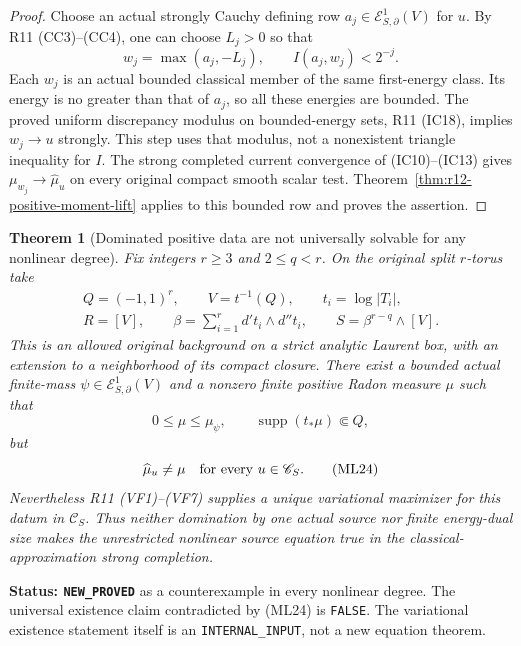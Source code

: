 \documentclass[11pt,a4paper]{article}
\numberwithin{equation}{section}
\newtheorem{theorem}{Theorem}[section]
\theoremstyle{definition}
\theoremstyle{remark}
\begin{document}
\begin{proof}
Choose an actual strongly Cauchy defining row
$a_j\in\mathcal E^1_{S,\partial}(V)$ for $u$.
By R11 \textup{(CC3)--(CC4)}, one can choose $L_j>0$ so that
\[
 w_j=\max(a_j,-L_j),\qquad I(a_j,w_j)<2^{-j}.
 \tag{ML21}
\]
Each $w_j$ is an actual bounded classical member of the same
first-energy class.  Its energy is no greater than that of
$a_j$, so all these energies are bounded.  The proved uniform
discrepancy modulus on bounded-energy sets, R11
\textup{(IC18)}, implies $w_j\to u$ strongly.  This step
uses that modulus, not a nonexistent triangle inequality for
$I$.  The strong completed current convergence of
\textup{(IC10)--(IC13)} gives
$\mu_{w_j}\to\widehat\mu_u$ on every original compact smooth
scalar test.  Theorem~\ref{thm:r12-positive-moment-lift}
applies to this bounded row and proves the assertion.
\end{proof}

\begin{theorem}[Dominated positive data are not universally solvable for any nonlinear degree]
\label{thm:r12-nonlinear-dominated-source-counterexample}
Fix integers $r\ge3$ and $2\le q<r$.  On the original split
$r$-torus take
\[
 \begin{gathered}
 Q=(-1,1)^r,\qquad V=t^{-1}(Q),\qquad t_i=\log|T_i|,\\
 R=[V],\qquad \beta=\sum_{i=1}^r d't_i\wedge d''t_i,
 \qquad S=\beta^{r-q}\wedge[V].
 \end{gathered}
 \tag{ML22}
\]
This is an allowed original background on a strict analytic
Laurent box, with an extension to a neighborhood of its compact
closure.  There exist a bounded actual finite-mass
$\psi\in\mathcal E^1_{S,\partial}(V)$ and a nonzero finite
positive Radon measure $\mu$ such that
\[
                       0\le\mu\le\mu_\psi,
 \qquad \operatorname{supp}(t_*\mu)\Subset Q,
 \tag{ML23}
\]
but
\[
       \widehat\mu_u\ne\mu\quad\hbox{for every }u\in\mathscr C_S.
 \tag{ML24}
\]
Nevertheless R11 \textup{(VF1)--(VF7)} supplies a unique
variational maximizer for this datum in $\mathscr C_S$.
Thus neither domination by one actual source nor finite
energy-dual size makes the unrestricted nonlinear source
equation true in the classical-approximation strong completion.
\end{theorem}

\noindent\textbf{Status: \texttt{NEW\_PROVED}} as a
counterexample in every nonlinear degree.  The universal existence
claim contradicted by \textup{(ML24)} is \texttt{FALSE}.
The variational existence statement itself is an
\texttt{INTERNAL\_INPUT}, not a new equation theorem.
\end{document}
